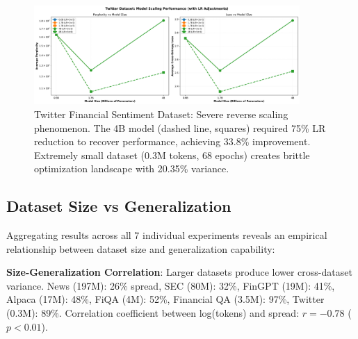 \begin{figure}[h]
\centering
\includegraphics[width=0.9\textwidth]{figures/scaling_twitter.png}
\caption[Twitter Financial Sentiment Dataset: Reverse Scaling]{Twitter Financial Sentiment Dataset: Severe reverse scaling phenomenon. The 4B model (dashed line, squares) required 75\% LR reduction to recover performance, achieving 33.8\% improvement. Extremely small dataset (0.3M tokens, 68 epochs) creates brittle optimization landscape with 20.35\% variance.}
\label{fig:scaling_twitter}
\end{figure}





\subsection{Dataset Size vs Generalization}

Aggregating results across all 7 individual experiments reveals an empirical relationship between dataset size and generalization capability:

\textbf{Size-Generalization Correlation}: Larger datasets produce lower cross-dataset variance. News (197M): 26\% spread, SEC (80M): 32\%, FinGPT (19M): 41\%, Alpaca (17M): 48\%, FiQA (4M): 52\%, Financial QA (3.5M): 97\%, Twitter (0.3M): 89\%. Correlation coefficient between log(tokens) and spread: $r = -0.78$ ($p < 0.01$).

